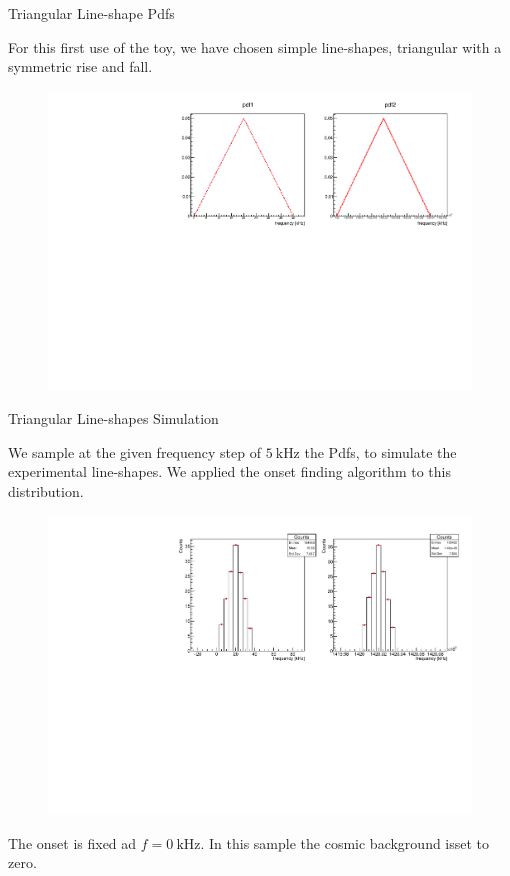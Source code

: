 \documentclass[9pt]{beamer}
\begin{document}
\begin{frame}{Triangular Line-shape Pdfs}

For this first use of the toy, we have chosen simple line-shapes, triangular with a symmetric rise and fall.

\begin{figure}
\centering
\includegraphics[width = \textwidth]{../Plot/Pdf1Pdf2.pdf}
\end{figure}

\end{frame}

\begin{frame}{Triangular Line-shapes Simulation}

We sample at the given frequency step of $\SI{5}{ \kilo \hertz}$ the Pdfs, to simulate the experimental line-shapes. We applied the onset finding algorithm to this distribution.
 
\begin{figure}
\includegraphics[width = \textwidth]{TriangleLineShape.pdf}
\end{figure}

The onset is fixed ad $f = \SI{0}{\kilo \hertz}$. In this sample the cosmic background is\newline set to zero.

\end{frame}
\end{document}
